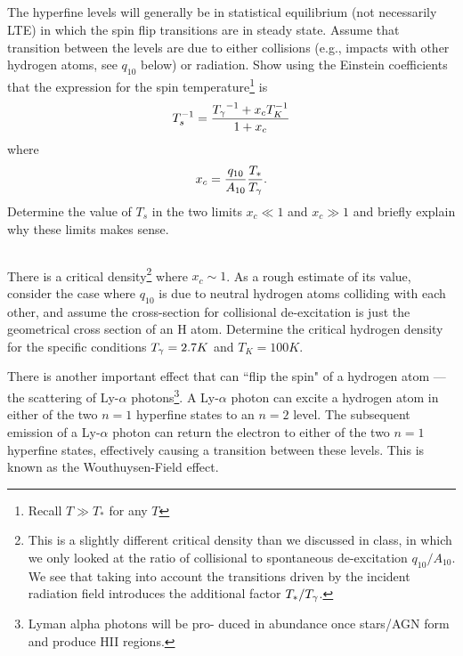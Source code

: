 \documentclass[11pt]{article}
\begin{document}
\subsection{}
The hyperfine levels will generally be in statistical equilibrium (not
necessarily LTE) in which the spin flip transitions are in steady state. Assume
that transition between the levels are due to either collisions (e.g., impacts
with other hydrogen atoms, see $q_{10}$ below) or radiation. Show using the Einstein coefficients
that the expression for the spin temperature\footnote{Recall $T\gg T_*$ for any $T$} is
\begin{equation}
T_s^{-1}=\frac{{T_\gamma}^{-1}+x_cT_K^{-1}}{1+x_c}
\end{equation}
where
\begin{equation}
x_c=\frac{q_{10}}{A_{10}}\frac{T_*}{{T_\gamma}}.
\end{equation}
Determine the value of $T_s$ in the two limits $x_c\ll1$ and $x_c\gg1$ and
briefly explain why these limits makes sense.

\subsection{}
\label{sec:subc}
There is a critical density\footnote{This is a slightly different critical
density than we discussed in class, in which we only looked at the ratio of
collisional to spontaneous de-excitation $q_{10}/A_{10}$.  We see that taking into
account the transitions driven by the incident radiation field introduces the
additional factor $T_*/{T_\gamma}$.} where $x_c\sim1$. As a rough estimate of its value,
consider the case where $q_{10}$ is due to neutral hydrogen atoms colliding with
each other, and assume the cross-section for collisional de-excitation is just
the geometrical cross section of an
H atom. Determine the critical hydrogen density for the specific conditions 
${T_\gamma}=2.7K$ and $T_K=100K$.

There is another important effect that can ``flip the spin" of a hydrogen atom
--- the scattering of Ly-$\alpha$ photons\footnote{ Lyman alpha photons will be
pro- duced in abundance once stars/AGN form and produce HII regions.  }. A
Ly-$\alpha$ photon can excite a hydrogen atom in either of the two $n = 1$
hyperfine states to an $n = 2$ level.  The subsequent emission of a Ly-$\alpha$
photon can return the electron to either of the two $n = 1$ hyperfine states,
effectively causing a transition between these levels. This is known as the
Wouthuysen-Field effect.
\end{document}
